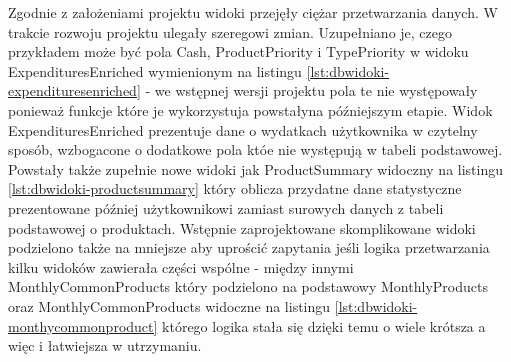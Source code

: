 \documentclass[a4paper, 10pt, twoside, openright]{report}
\begin{document}
\begin{large}
{Zgodnie z założeniami projektu widoki przejęły ciężar przetwarzania danych. W 
trakcie rozwoju projektu ulegały szeregowi zmian. Uzupełniano je, 
czego przykładem może być pola Cash, ProductPriority i TypePriority w widoku 
ExpendituresEnriched wymienionym na listingu 
\ref*{lst:dbwidoki-expendituresenriched} - we wstępnej wersji projektu pola te 
nie występowały ponieważ funkcje które je wykorzystuja powstałyna późniejszym 
etapie. Widok ExpendituresEnriched prezentuje dane o wydatkach użytkownika w 
czytelny sposób, wzbogacone o dodatkowe pola któe nie występują w tabeli 
podstawowej. Powstały także zupełnie nowe widoki jak ProductSummary widoczny na 
listingu \ref*{lst:dbwidoki-productsummary} który oblicza przydatne dane 
statystyczne prezentowane później użytkownikowi zamiast surowych danych z tabeli
 podstawowej o produktach. Wstępnie zaprojektowane skomplikowane widoki 
podzielono także na mniejsze aby uprościć zapytania jeśli logika przetwarzania 
kilku widoków zawierała części wspólne - między innymi MonthlyCommonProducts 
który podzielono na podstawowy MonthlyProducts oraz MonthlyCommonProducts 
widoczne na listingu \ref*{lst:dbwidoki-monthycommonproduct} którego logika 
stała się dzięki temu o wiele krótsza a więc i łatwiejsza w utrzymaniu.}



\end{large}
\end{document}
